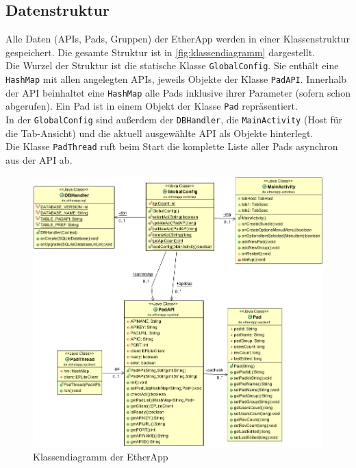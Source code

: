 \subsection{Datenstruktur}
Alle Daten (APIs, Pads, Gruppen) der EtherApp werden in einer Klassenstruktur gespeichert. Die gesamte Struktur ist in \autoref{fig:klassendiagramm} dargestellt.\\
Die Wurzel der Struktur ist die statische Klasse \texttt{GlobalConfig}.
Sie enthält eine \texttt{HashMap} mit allen angelegten APIs, jeweils Objekte der Klasse \texttt{PadAPI}.
Innerhalb der API beinhaltet eine \texttt{HashMap} alle Pads inklusive ihrer Parameter (sofern schon abgerufen).
Ein Pad ist in einem Objekt der Klasse \texttt{Pad} repräsentiert.\\
In der \texttt{GlobalConfig} sind außerdem der \texttt{DBHandler}, die \texttt{MainActivity} (Host für die Tab-Ansicht) und die aktuell ausgewählte API als Objekte hinterlegt.\\
Die Klasse \texttt{PadThread} ruft beim Start die komplette Liste aller Pads asynchron aus der API ab.

\begin{figure}[H]
	\centering
	\includegraphics[width=\textwidth]{./inc/etherapp_classes.png}
	\caption{Klassendiagramm der EtherApp}
	\label{fig:klassendiagramm}
\end{figure}




